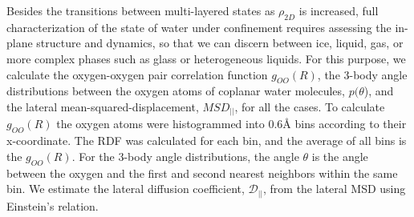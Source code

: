\documentclass[journal=acsnano,manuscript=article]{achemso}
\begin{document}

Besides the transitions between multi-layered states as \(\rho_{2D}\) is increased, full characterization of the state of water under confinement requires assessing the in-plane structure and dynamics, so that we can discern between ice, liquid, gas, or more complex phases such as glass or heterogeneous liquids. For this purpose, we calculate the oxygen-oxygen pair correlation function \(g_{OO}(R)\), the 3-body angle distributions between the oxygen atoms of coplanar water molecules, \(p(\theta\)), and the lateral mean-squared-displacement, \(MSD_{||}\), for all the cases. To calculate \(g_{OO}(R)\) the oxygen atoms were histogrammed into 0.6\r A bins according to their x-coordinate. The RDF was calculated for each bin, and the average of all bins is the \(g_{OO}(R)\). For the 3-body angle distributions, the angle \(\theta\) is the angle between the oxygen and the first and second nearest neighbors within the same bin. We estimate the lateral diffusion coefficient, \(\mathcal{D}_{||}\), from the lateral MSD using Einstein's relation.
\end{document}
